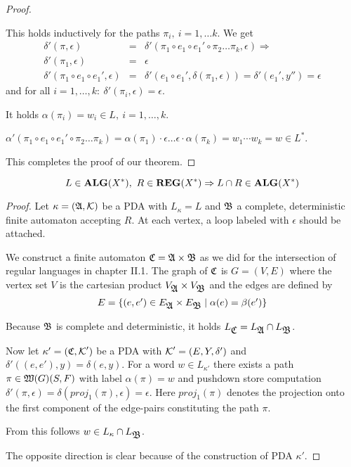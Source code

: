 \begin{proof}
\begin{enumerate}
  This holds inductively for the paths $\pi_i,\ i = 1, \ldots k$. We get
  \begin{eqnarray*}
  \delta'(\pi, \epsilon) &=& \delta'(\pi_1 \circ e_1 \circ e_1' \circ \pi_2
  \ldots \pi_k, \epsilon) \Rightarrow \\
  \delta'(\pi_1, \epsilon) &=& \epsilon \\
  \delta'(\pi_1 \circ e_1 \circ e_1', \epsilon) &=& \delta'(e_1 \circ e_1',
  \delta(\pi_1, \epsilon)) = \delta'(e_1', y'') = \epsilon
  \end{eqnarray*}
  and for all $i = 1, \ldots, k:\ \delta'(\pi_i, \epsilon) = \epsilon$. 
  
  It holds $\alpha(\pi_i) = w_i \in L,\ i = 1, \ldots, k$.
  
  $\alpha'(\pi_1 \circ e_1 \circ e_1' \circ \pi_2 \ldots \pi_k) = \alpha(\pi_1)
  \cdot \epsilon \ldots \epsilon \cdot \alpha(\pi_k) = w_1 \cdots w_k = w \in
  L^*$.
\end{enumerate}

This completes the proof of our theorem.
\end{proof}

\bigskip
\begin{theorem}
\label{alg-lang-closure-reg-intersect}
\[ L \in \mbox{{\bf ALG}}(X^*),\ R \in \mbox{{\bf REG}}(X^*)\Rightarrow L \cap R \in \mbox{{\bf ALG}}(X^*) \]
\end{theorem}

\begin{proof}
Let $\kappa = (\mbox{$\mathfrak{A}$}, \mbox{$\mathcal{K}$})$ be a PDA with $L_{\kappa} = L$ and $\mbox{$\mathfrak{B}$}$
a complete, deterministic finite automaton accepting $R$. At each vertex, a loop
labeled with $\epsilon$ should be attached.

We construct a finite automaton $\mbox{$\mathfrak{C}$} = \mbox{$\mathfrak{A}$} \times \mbox{$\mathfrak{B}$}$ as we did for
the intersection of regular languages in chapter II.1. The graph of $\mbox{$\mathfrak{C}$}$ is
$G = (V, E)$ where the vertex set $V$ is the cartesian product $V_{\mbox{$\mathfrak{A}$}}
\times V_{\mbox{$\mathfrak{B}$}}$ and the edges are defined by
\[ E = \mbox{$\{(e, e') \in E_{\mbox{$\mathfrak{A}$}} \times E_{\mbox{$\mathfrak{B}$}} \mid \alpha(e) =
\beta(e') \}$} \]

Because $\mbox{$\mathfrak{B}$}$ is complete and deterministic, it holds $L_{\mbox{$\mathfrak{C}$}} =
L_{\mbox{$\mathfrak{A}$}} \cap L_{\mbox{$\mathfrak{B}$}}$.

Now let $\kappa' = (\mbox{$\mathfrak{C}$}, \mbox{$\mathcal{K}$}')$ be a PDA with $\mbox{$\mathcal{K}$}' = (E,
Y, \delta')$ and $\delta'((e, e'), y) = \delta(e, y)$.
For a word $w \in L_{\kappa'}$ there exists a path $\pi \in
\mbox{$\mathfrak{W}({G})$}(S, F)$ with label $\alpha(\pi) = w$ and pushdown store
computation $\delta'(\pi, \epsilon) = \delta(proj_1(\pi), \epsilon) = \epsilon$.
Here $proj_1(\pi)$ denotes the projection onto the first component of the
edge-pairs constituting the path $\pi$.

From this follows $w \in L_{\kappa} \cap L_{\mbox{$\mathfrak{B}$}}$.

The opposite direction is clear because of the construction of PDA $\kappa'$.
\end{proof}

